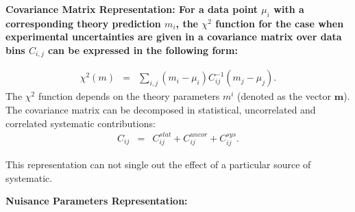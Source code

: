 \begin{description}
\item \bf {Covariance Matrix Representation:} \rm
For a data point  $\mu_i$ with a corresponding theory prediction $m_i$, the $\chi^2$ function for the case when experimental uncertainties are given in a covariance matrix over data bins $C_{i,j}$ can be expressed in the following form:

\begin{eqnarray}
\chi^2 (m)& = & \sum_{i,j}(m_i-\mu_i)C^{-1}_{ij}(m_j-\mu_j).
\end{eqnarray}
The $\chi^2$ function depends on the theory parameters $m^i$ 
(denoted as the vector $\boldsymbol{m}$).
The covariance matrix can be decomposed in statistical, uncorrelated and correlated systematic contributions: 
\begin{eqnarray}
C_{ij}& = & C^{stat}_{ij}+C^{uncor}_{ij}+C^{sys}_{ij}.
\end{eqnarray}

This representation can not single out the effect of a particular
source of systematic.

\item \bf{Nuisance Parameters Representation:} \rm



\end{description}
